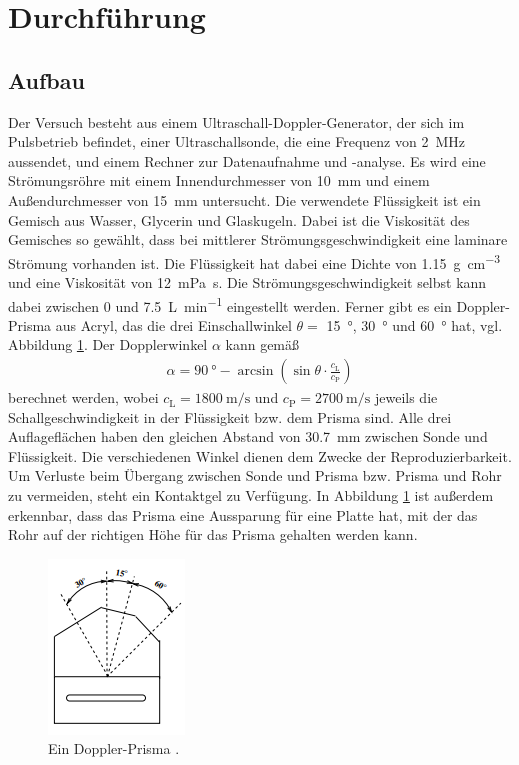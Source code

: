 \section{Durchführung}
\subsection{Aufbau}
Der Versuch besteht aus einem Ultraschall-Doppler-Generator, der sich im Pulsbetrieb befindet, einer Ultraschallsonde, die eine Frequenz
von \qty{2}{\mega\hertz} aussendet, und einem Rechner zur Datenaufnahme und -analyse.
Es wird eine Strömungsröhre mit einem Innendurchmesser von \qty{10}{\milli\meter} und einem Außendurchmesser von \qty{15}{\milli\meter}
untersucht.
Die verwendete Flüssigkeit ist ein Gemisch aus Wasser, Glycerin und Glaskugeln.
Dabei ist die Viskosität des Gemisches so gewählt, dass bei mittlerer Strömungsgeschwindigkeit eine laminare Strömung vorhanden ist.
Die Flüssigkeit hat dabei eine Dichte von \qty{1.15}{\gram\per\cubic\centi\meter} und eine Viskosität von \qty{12}{\milli\pascal\second}. 
Die Strömungsgeschwindigkeit selbst kann dabei zwischen 0 und \qty{7.5}{\liter\per\minute} eingestellt werden.
Ferner gibt es ein Doppler-Prisma aus Acryl, das die drei Einschallwinkel $\theta =$ \qty{15}{\degree}, \qty{30}{\degree} und \qty{60}{\degree} hat,
vgl. Abbildung \ref{fig:prisma}.
Der Dopplerwinkel $\alpha$ kann gemäß
\begin{align}
    \alpha = \qty{90}{\degree} - \arcsin\left(\sin\theta \cdot \frac{c_\text{L}}{c_\text{P}}\right)
    \label{eq:dopplerwinkel}
\end{align}
berechnet werden, wobei $c_\text{L} = \qty{1800}{\meter\per\second}$ und $c_\text{P} = \qty{2700}{\meter\per\second}$ jeweils die 
Schallgeschwindigkeit in der Flüssigkeit bzw. dem Prisma sind.
Alle drei Auflageflächen haben den gleichen Abstand von \qty{30.7}{\milli\meter} zwischen Sonde und Flüssigkeit.
Die verschiedenen Winkel dienen dem Zwecke der Reproduzierbarkeit.
Um Verluste beim Übergang zwischen Sonde und Prisma bzw. Prisma und Rohr zu vermeiden, steht ein Kontaktgel zu Verfügung.
In Abbildung \ref{fig:prisma} ist außerdem erkennbar, dass das Prisma eine Aussparung für eine Platte hat, mit der das Rohr auf der richtigen
Höhe für das Prisma gehalten werden kann.

\begin{figure}[H]
    \centering
    \includegraphics[height = 5 cm]{Abbildungen/prisma.png}
    \caption{Ein Doppler-Prisma \cite{man:us3}.}
    \label{fig:prisma}
\end{figure}


